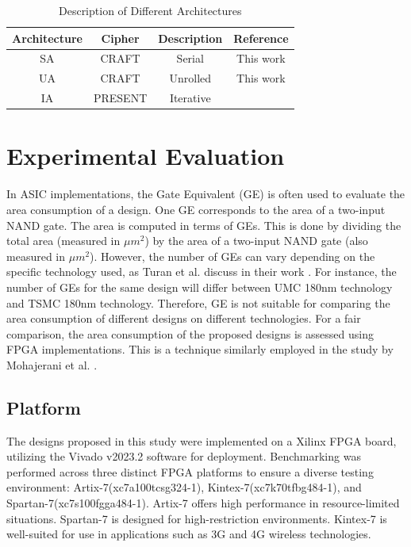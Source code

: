 \documentclass[final,5p,times,twocolumn]{elsarticle}
\begin{document}
\begin{table}[h]
    \centering
    \caption{Description of Different Architectures}\label{tab2}%
    \begin{tabular}{|c|c|c|c|}
        \hline
        Architecture & Cipher  & Description & Reference           \\
        \hline
        SA           & CRAFT   & Serial      & This work           \\
        UA           & CRAFT   & Unrolled    & This work           \\
        IA           & PRESENT & Iterative   & \cite{Bharathi2022} \\
        \hline
    \end{tabular}
\end{table}


\section{Experimental Evaluation}\label{sec4}

In ASIC implementations, the Gate Equivalent (GE) is often used to evaluate the area consumption of a design.
One GE corresponds to the area of a two-input NAND gate.
The area is computed in terms of GEs.
This is done by dividing the total area (measured in $\mu m^2$) by the area of a two-input NAND gate (also measured in $\mu m^2$).
However, the number of GEs can vary depending on the specific technology used, as Turan et al. discuss in their work \cite{Turan}.
For instance, the number of GEs for the same design will differ between UMC 180nm technology and TSMC 180nm technology.
Therefore, GE is not suitable for comparing the area consumption of different designs on different technologies.
For a fair comparison, the area consumption of the proposed designs is assessed using FPGA implementations.
This is a technique similarly employed in the study by Mohajerani et al. \cite{Mohajerani2020}.

\subsection{Platform}\label{subsec4}

The designs proposed in this study were implemented on a Xilinx FPGA board, utilizing the Vivado v2023.2 software for deployment.
Benchmarking was performed across three distinct FPGA platforms to ensure a diverse testing environment: Artix-7(xc7a100tcsg324-1), Kintex-7(xc7k70tfbg484-1), and Spartan-7(xc7s100fgga484-1).
Artix-7 offers high performance in resource-limited situations. Spartan-7 is designed for high-restriction environments. Kintex-7 is well-suited for use in applications such as 3G and 4G wireless technologies.
\end{document}
